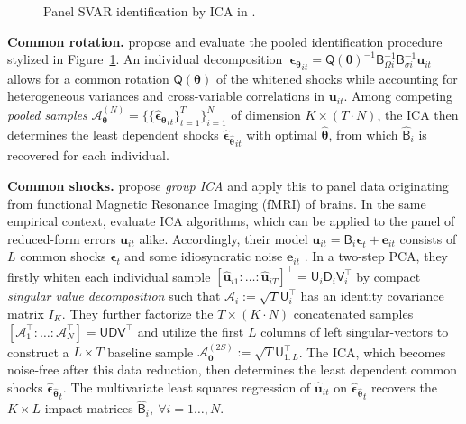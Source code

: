 \begin{figure}[ht]	%
	\centering
	\caption{Panel SVAR identification by ICA in \citet{Herwartz2017}.}
	\resizebox{0.75\textwidth}{!}{
		}
	\label{fig:PSVAR}
\end{figure}


\textbf{Common rotation.} \citet{Herwartz2017} propose and evaluate the pooled identification procedure stylized in Figure~\ref{fig:PSVAR}. An individual decomposition $ \ \boldsymbol{\epsilon_\theta}_{it} = \mathsf{Q} \left( \boldsymbol{\theta} \right)^{-1} \textsf{B}_{\Omega i}^{-1} \mathsf{B}_{\sigma i}^{-1} \boldsymbol{u}_{it} $ allows for a common rotation $ \mathsf{Q} \left( \boldsymbol{\theta} \right) $ of the whitened shocks while accounting for heterogeneous variances and cross-variable correlations in $ \boldsymbol{u}_{it} $. Among competing \textit{pooled samples} $ \mathcal{A}_{\boldsymbol{\theta}}^{(N)} = \{ \{ \boldsymbol{\widehat{\epsilon}_\theta}_{it} \}^T_{t=1} \}^N_{i=1} $ of dimension $ K \times (T \cdot N) $, the ICA then determines the least dependent shocks $ \boldsymbol{\widehat{\epsilon}_{\widehat{\theta}}}_{it} $ with optimal $ \boldsymbol{\widehat{\theta}} $, from which $ \widehat{\mathsf{B}}_i $ is recovered for each individual.


\textbf{Common shocks.} \citet{CalhounEtAl2002} propose \textit{group ICA} and apply this to panel data originating from functional Magnetic Resonance Imaging (fMRI) of brains. In the same empirical context, \citet{RiskEtAl2014} evaluate ICA algorithms, which can be applied to the panel of reduced-form errors $ \boldsymbol{u}_{it} $ alike. Accordingly, their model $ \boldsymbol{u}_{it} = \mathsf{B}_i \boldsymbol{\epsilon}_{t} + \boldsymbol{e}_{it} $ consists of $ L $ common shocks $ \boldsymbol{\epsilon}_{t} $ and some idiosyncratic noise $ \boldsymbol{e}_{it} $ \citep[p.~227]{RiskEtAl2014}. In a two-step PCA, they firstly whiten each individual sample $ \left[\boldsymbol{\widehat{u}}_{i1}: \ldots: \boldsymbol{\widehat{u}}_{iT} \right]^\top = \mathsf{U}_i^{\ } \mathsf{D}_i^{\ } \mathsf{V}_i^\top $ by compact \textit{singular value decomposition} such that $ \mathcal{A}_i := \sqrt{T} \mathsf{U}_i^\top $ has an identity covariance matrix $ I_K $. They further factorize the $ T \times (K \cdot N) $ concatenated samples $ \left[ \mathcal{A}_1^\top : \ldots : \mathcal{A}_N^\top \right] = \mathsf{U} \mathsf{D} \mathsf{V}^\top $ and utilize the first $ L $ columns of left singular-vectors to construct a $ L \times T $ baseline sample $ \mathcal{A}_{\boldsymbol{0}}^{(2S)} := \sqrt{T} \mathsf{U}_{1:L}^\top $. The ICA, which becomes noise-free after this data reduction, then determines the least dependent common shocks $ \boldsymbol{\widehat{\epsilon}_{\widehat{\theta}}}_t $. The multivariate least squares regression of $ \boldsymbol{\widehat{u}}_{it} $ on $ \boldsymbol{\widehat{\epsilon}_{\widehat{\theta}}}_t $ recovers the $ K \times L $ impact matrices $ \mathsf{\widehat{B}}_i, \ \forall i=1\ldots,N $.


